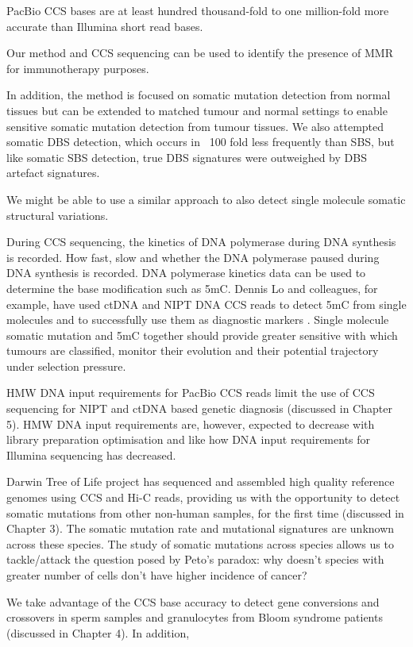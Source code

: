 PacBio CCS bases are at least hundred thousand-fold to one million-fold more accurate than Illumina short read bases. 

Our method and CCS sequencing can be used to identify the presence of MMR for immunotherapy purposes. 

In addition, the method is focused on somatic mutation detection from normal tissues but can be extended to matched tumour and normal settings to enable sensitive somatic mutation detection from tumour tissues. We also attempted somatic DBS detection, which occurs in ~100 fold less frequently than SBS, but like somatic SBS detection, true DBS signatures were outweighed by DBS artefact signatures. 

We might be able to use a similar approach to also detect single molecule somatic structural variations. 

During CCS sequencing, the kinetics of DNA polymerase during DNA synthesis is recorded. How fast, slow and whether the DNA polymerase paused during DNA synthesis is recorded. DNA polymerase kinetics data can be used to determine the base modification such as 5mC. Dennis Lo and colleagues, for example, have used ctDNA and NIPT DNA CCS reads to detect 5mC from single molecules and to successfully use them as diagnostic markers \cite{Vong2019-bi, Tse2021-or}. Single molecule somatic mutation and 5mC together should provide greater sensitive with which tumours are classified, monitor their evolution and their potential trajectory under selection pressure. 

HMW DNA input requirements for PacBio CCS reads limit the use of CCS sequencing for NIPT and ctDNA based genetic diagnosis (discussed in Chapter 5). HMW DNA input requirements are, however, expected to decrease with library preparation optimisation and like how DNA input requirements for Illumina sequencing has decreased. 

Darwin Tree of Life project has sequenced and assembled high quality reference genomes using CCS and Hi-C reads, providing us with the opportunity to detect somatic mutations from other non-human samples, for the first time (discussed in Chapter 3). The somatic mutation rate and mutational signatures are unknown across these species. The study of somatic mutations across species allows us to tackle/attack the question posed by Peto's paradox: why doesn't species with greater number of cells don't have higher incidence of cancer?

We take advantage of the CCS base accuracy to detect gene conversions and crossovers in sperm samples and granulocytes from Bloom syndrome patients (discussed in Chapter 4). In addition,

